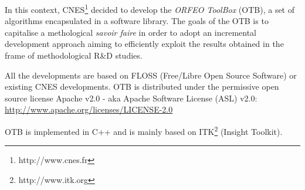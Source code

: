In this context, CNES\footnote{http://www.cnes.fr} decided to develop
the \emph{ORFEO ToolBox} (OTB), a set of algorithms encapsulated in a
software library. The goals of the OTB is to capitalise a methological
\textit{savoir faire} in order to adopt an incremental development
approach aiming to efficiently exploit the results obtained in the
frame of methodological R\&D studies.

All the developments are based on FLOSS (Free/Libre Open Source Software) or
existing CNES developments. OTB is distributed under the permissive open
source license Apache v2.0 - aka Apache Software License (ASL) v2.0:\\
\url{http://www.apache.org/licenses/LICENSE-2.0}

OTB is implemented in C++ and is mainly based on
ITK\footnote{http://www.itk.org} (Insight Toolkit).

